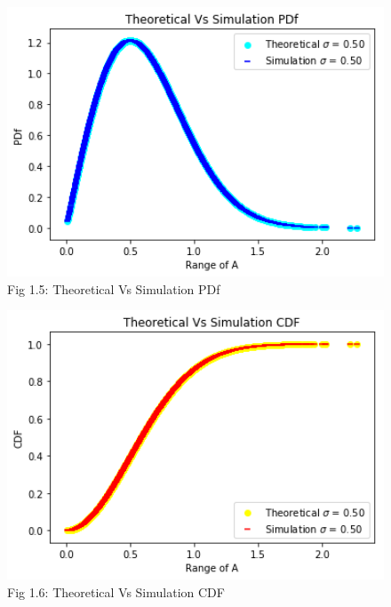 \documentclass[journal,12pt,twocolumn]{IEEEtran}
\begin{document}
\begin{figure}[h!]
    \includegraphics[width=14cm]{Assignment-1/Codes/Figures/theo_Vs_sim_pdf.png}
    \caption*{Fig 1.5: Theoretical Vs Simulation PDf}
\end{figure}
\begin{figure}[h!]
    \includegraphics[width=14cm]{Assignment-1/Codes/Figures/theo_Vs_sim_cdf.png}
    \caption*{Fig 1.6: Theoretical Vs Simulation CDF}
\end{figure}
\end{document}
